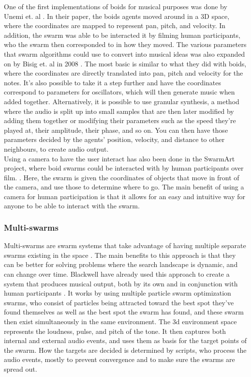 \documentclass[a4paper,english]{report}
\begin{document}
	One of the first implementations of boids for musical purposes was done by Unemi et. al \cite{unemi2005music}. In their paper, the boids agents moved around in a 3D space, where the coordinates are mapped to represent pan, pitch, and velocity. In addition, the swarm was able to be interacted it by filming human participants, who the swarm then corresponded to in how they moved. The various parameters that swarm algorithms could use to convert into musical ideas was also expanded on by Bisig et. al in 2008 \cite{bisig2008swarm}. The most basic is similar to what they did with boids, where the coordinates are directly translated into pan, pitch and velocity for the notes. It's also possible to take it a step further and have the coordinates correspond to parameters for oscillators, which will then generate music when added together. Alternatively, it is possible to use granular synthesis, a method where the audio is split up into small samples that are then later modified by adding them together or modifying their parameters such as the speed they're played at, their amplitude, their phase, and so on. You can then have those parameters decided by the agents' position, velocity, and distance to other neighbours, to create audio output.\\
	Using a camera to have the user interact has also been done in the SwarmArt project, where boid swarms could be interacted with by human participants over film. \cite{boyd2004swarmart}. Here, the swarm is given the coordinates of objects that move in front of the camera, and use those to determine where to go. The main benefit of using a camera for human participation is that it allows for an easy and intuitive way for anyone to be able to interact with the swarm.
	
	\subsubsection{Multi-swarms}
	Multi-swarms are swarm systems that take advantage of having multiple separate swarms existing in the space \cite{blackwell2004multi}. The main benefits to this approach is that they can be better for solving problems where the search landscape is dynamic, and can change over time. Blackwell have already used this approach to create a system that produces musical output, both by its own and in conjunction with human participants \cite{blackwell2003swarm}. It works by using multiple particle swarm optimization swarms, who consist of particles being attracted toward the best spot they've found themselves as well as the best spot the swarm has found, and these swarm then exist simultaneously in the same environment. The 3d environment space represents the loudness, pulse, and pitch of the tone. It then captures both internal and external audio events, and uses them as basis for the target points of the swarm. How the targets are decided is determined by scripts, who process the audio events, mostly to prevent convergence and to make sure the swarms are spread out.
	\iffalse
\end{document}
